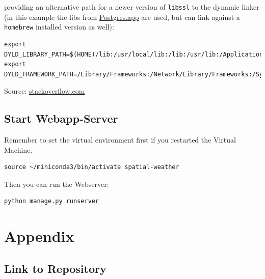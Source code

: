 \documentclass[paper=a4, fontsize=11pt]{scrartcl} %
\numberwithin{equation}{section} %
\numberwithin{figure}{section} %
\numberwithin{table}{section} %
\begin{document}
providing an alternative path for a newer version of \texttt{libssl} to
the dynamic linker (in this example the libs from
\href{http://postgresapp.com}{Postgres.app} are used, but can link
against a \texttt{homebrew} installed version as well):

\begin{lstlisting}[breaklines=true]
export DYLD_LIBRARY_PATH=$(HOME)/lib:/usr/local/lib:/lib:/usr/lib:/Applications/Postgres.app/Contents/Versions/9.3/lib
export DYLD_FRAMEWORK_PATH=/Library/Frameworks:/Network/Library/Frameworks:/System/Library/Frameworks
\end{lstlisting}

Source:
\href{http://stackoverflow.com/questions/11365619/psycopg2-installation-error-library-not-loaded-libssl-dylib}{stackoverflow.com}


\subsection{Start Webapp-Server}
Remember to set the virtual environment first if you restarted the Virtual Machine.
\begin{lstlisting}
source ~/miniconda3/bin/activate spatial-weather
\end{lstlisting}
Then you can run the Webserver:
\begin{lstlisting}
python manage.py runserver
\end{lstlisting}

\section{Appendix}
\subsection{Link to Repository}
\end{document}
